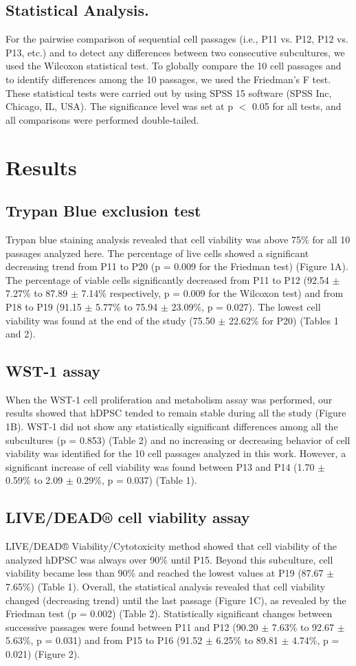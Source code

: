 \documentclass[a4paper,12pt]{article}
\begin{document}
\subsection{Statistical Analysis.}
For the pairwise comparison of sequential cell passages (i.e., P11 vs. P12, P12 vs. P13, etc.) and to detect any differences between two consecutive subcultures, we used the Wilcoxon statistical test. To globally compare the 10 cell passages and to identify differences among the 10 passages, we used the Friedman’s F test. These statistical tests were carried out by using SPSS 15 software (SPSS Inc, Chicago, IL, USA). The significance level was set at p $<$ 0.05 for all tests, and all comparisons were performed double-tailed.
\section{Results}
\subsection{Trypan Blue exclusion test}
Trypan blue staining analysis revealed that cell viability was above 75\% for all 10 passages analyzed here. The percentage of live cells showed a significant decreasing trend from P11 to P20 (p = 0.009 for the Friedman test) (Figure 1A). The percentage of viable cells significantly decreased from P11 to P12 (92.54 $\pm$ 7.27\% to 87.89 $\pm$ 7.14\% respectively, p = 0.009 for the Wilcoxon test) and from P18 to P19 (91.15 $\pm$ 5.77\% to 75.94 $\pm$ 23.09\%, p = 0.027). The lowest cell viability was found at the end of the study (75.50 $\pm$ 22.62\% for P20) (Tables 1 and 2).

\subsection{WST-1 assay}
When the WST-1 cell proliferation and metabolism assay was performed, our results showed that hDPSC tended to remain stable during all the study (Figure 1B). WST-1 did not show any statistically significant differences among all the subcultures (p = 0.853) (Table 2) and no increasing or decreasing behavior of cell viability was identified for the 10 cell passages analyzed in this work. However, a significant increase of cell viability was found between P13 and P14 (1.70 $\pm$ 0.59\% to 2.09 $\pm$ 0.29\%, p = 0.037) (Table 1). 
\subsection{LIVE/DEAD® cell viability assay}
LIVE/DEAD® Viability/Cytotoxicity method showed that cell viability of the analyzed hDPSC was always over 90\% until P15. Beyond this subculture, cell viability became less than 90\% and reached the lowest values at P19 (87.67 $\pm$ 7.65\%) (Table 1). Overall, the statistical analysis revealed that cell viability changed (decreasing trend) until the last passage (Figure 1C), as revealed by the Friedman test (p = 0.002) (Table 2). Statistically significant changes between successive passages were found between P11 and P12 (90.20 $\pm$ 7.63\% to 92.67 $\pm$ 5.63\%, p = 0.031) and from P15 to P16 (91.52 $\pm$ 6.25\% to 89.81 $\pm$ 4.74\%, p = 0.021) (Figure 2).
\end{document}
